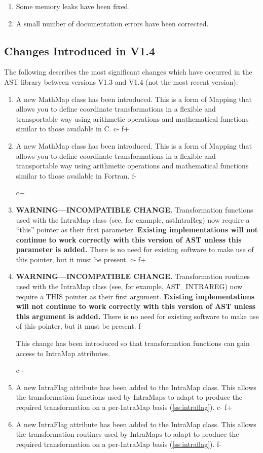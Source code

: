 \documentclass[twoside,11pt]{article}
\newcommand{\secref}[1]{\S\ref{#1}}
\renewcommand{\secref}[1]{\ref{#1}}
\begin{document}
\begin{enumerate}
\item Some memory leaks have been fixed.

\item A small number of documentation errors have been corrected.
\end{enumerate}

\subsection{Changes Introduced in V1.4}

The following describes the most significant changes which have occurred
in the AST library between versions V1.3 and V1.4 (not the most recent
version):

\begin{enumerate}
c+
\item A new MathMap class has been introduced. This is a form of
Mapping that allows you to define coordinate transformations in a
flexible and transportable way using arithmetic operations and
mathematical functions similar to those available in C.
c-
f+
\item A new MathMap class has been introduced. This is a form of
Mapping that allows you to define coordinate transformations in a
flexible and transportable way using arithmetic operations and
mathematical functions similar to those available in Fortran.
f-

c+
\item {\bf{WARNING---INCOMPATIBLE CHANGE.}} Transformation functions
used with the IntraMap class (see, for example, astIntraReg) now
require a ``this'' pointer as their first parameter. {\bf{Existing
implementations will not continue to work correctly with this version
of AST unless this parameter is added.}} There is no need for existing
software to make use of this pointer, but it must be present.
c-
f+
\item {\bf{WARNING---INCOMPATIBLE CHANGE.}} Transformation routines
used with the IntraMap class (see, for example, AST\_INTRAREG) now
require a THIS pointer as their first argument. {\bf{Existing
implementations will not continue to work correctly with this version
of AST unless this argument is added.}} There is no need for existing
software to make use of this pointer, but it must be present.
f-

This change has been introduced so that transformation functions can gain
access to IntraMap attributes.

c+
\item A new IntraFlag attribute has been added to the IntraMap
class. This allows the transformation functions used by IntraMaps to
adapt to produce the required transformation on a per-IntraMap basis
(\secref{ss:intraflag}).
c-
f+
\item A new IntraFlag attribute has been added to the IntraMap
class. This allows the transformation routines used by IntraMaps to
adapt to produce the required transformation on a per-IntraMap basis
(\secref{ss:intraflag}).
f-


\end{enumerate}
\end{document}
